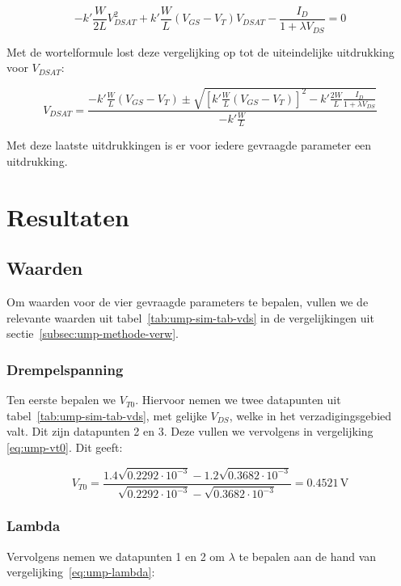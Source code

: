 \documentclass{scrartcl}
\begin{document}
$$-k'\frac{W}{2L}V_{DSAT}^2 + k'\frac{W}{L}(V_{GS}-V_{T})V_{DSAT} - \frac{I_{D}}{1 + \lambda V_{DS}} = 0$$

Met de wortelformule lost deze vergelijking op tot de uiteindelijke uitdrukking voor $V_{DSAT}$:

\begin{equation} \label{eq:ump-vdsat}
	V_{DSAT} = \frac{-k'\frac{W}{L}(V_{GS}-V_{T}) \pm \sqrt{[k'\frac{W}{L}(V_{GS}-V_{T})]^2 - k'\frac{2W}{L}\frac{I_{D}}{1 + \lambda V_{DS}}}}{-k'\frac{W}{L}}
\end{equation}

Met deze laatste uitdrukkingen is er voor iedere gevraagde parameter een uitdrukking.

\section{Resultaten}
\label{sec:ump-res}
\subsection{Waarden}
\label{subsec:ump-res-val}
Om waarden voor de vier gevraagde parameters te bepalen, vullen we de relevante waarden uit tabel~\ref{tab:ump-sim-tab-vds} in de vergelijkingen uit sectie~\ref{subsec:ump-methode-verw}.

\subsubsection{Drempelspanning}
\label{subsubsec:ump-res-val-vt0}
Ten eerste bepalen we $V_{T0}$. Hiervoor nemen we twee datapunten uit tabel~\ref{tab:ump-sim-tab-vds}, met gelijke $V_{DS}$, welke in het verzadigingsgebied valt. Dit zijn datapunten 2 en 3. Deze vullen we vervolgens in vergelijking \ref{eq:ump-vt0}. Dit geeft:

\begin{equation} \label{ump-vt0-num}
	V_{T0} = \frac{1.4\sqrt{0.2292 \cdot 10^{-3}} - 1.2\sqrt{0.3682 \cdot 10^{-3}}}{\sqrt{0.2292 \cdot 10^{-3}} - \sqrt{0.3682 \cdot 10^{-3}}} = 0.4521 \, \textrm{V}
\end{equation}

\subsubsection{Lambda}
\label{subsubsec:ump-res-val-lambda}
Vervolgens nemen we datapunten 1 en 2 om $\lambda$ te bepalen aan de hand van vergelijking~\ref{eq:ump-lambda}:
\end{document}
